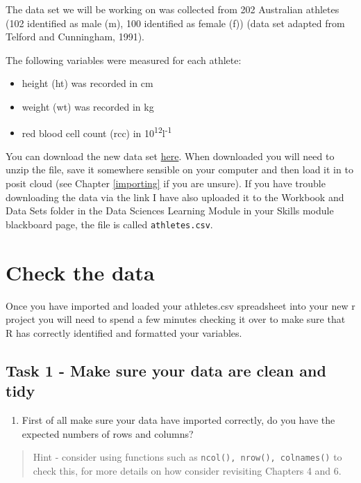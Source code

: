 \documentclass[
]{book}
\providecommand{\tightlist}{%
  \setlength{\itemsep}{0pt}\setlength{\parskip}{0pt}}
\begin{document}
The data set we will be working on was collected from 202 Australian athletes (102 identified as male (m), 100 identified as female (f)) (data set adapted from Telford and Cunningham, 1991).

The following variables were measured for each athlete:

\begin{itemize}
\tightlist
\item
  height (ht) was recorded in cm
\item
  weight (wt) was recorded in kg
\item
  red blood cell count (rcc) in 10\textsuperscript{12}l\textsuperscript{-1}
\end{itemize}

You can download the new data set \href{https://downgit.github.io/\#/home?url=https://github.com/ellenbell/4008Y/blob/main/data/athletes.csv}{here}. When downloaded you will need to unzip the file, save it somewhere sensible on your computer and then load it in to posit cloud (see Chapter \ref{importing} if you are unsure). If you have trouble downloading the data via the link I have also uploaded it to the Workbook and Data Sets folder in the Data Sciences Learning Module in your Skills module blackboard page, the file is called \texttt{athletes.csv}.

\section{Check the data}\label{check-the-data}

Once you have imported and loaded your athletes.csv spreadsheet into your new r project you will need to spend a few minutes checking it over to make sure that R has correctly identified and formatted your variables.

\subsection{Task 1 - Make sure your data are clean and tidy}\label{task-1---make-sure-your-data-are-clean-and-tidy}

\begin{enumerate}
\def\labelenumi{\arabic{enumi})}
\tightlist
\item
  First of all make sure your data have imported correctly, do you have the expected numbers of rows and columns?
\end{enumerate}

\begin{quote}
Hint - consider using functions such as \texttt{ncol(),\ nrow(),\ colnames()} to check this, for more details on how consider revisiting Chapters 4 and 6.
\end{quote}
\end{document}
